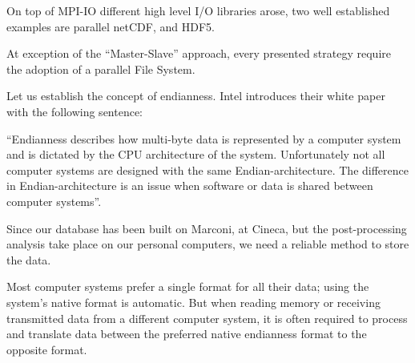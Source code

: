 On top of MPI-IO different high level I/O libraries arose, two well established examples are parallel netCDF, and HDF5. 

At exception of the ``Master-Slave'' approach, every presented strategy require the adoption of a parallel File System.

Let us establish the concept of endianness.
Intel introduces their white paper with the following sentence:\par
``Endianness describes how multi-byte data is represented by a computer system and is dictated by the CPU architecture of the system. Unfortunately not all computer systems are designed with the same Endian-architecture. The difference in Endian-architecture is an issue when software or data is shared between computer systems''\cite{endianness}.\par
Since our database has been built on Marconi, at Cineca, but the post-processing analysis take place on our personal computers, we need a reliable method to store the data. 

Most computer systems prefer a single format for all their data; using the system's native format is automatic. But when reading memory or receiving transmitted data from a different computer system, it is often required to process and translate data between the preferred native endianness format to the opposite format.